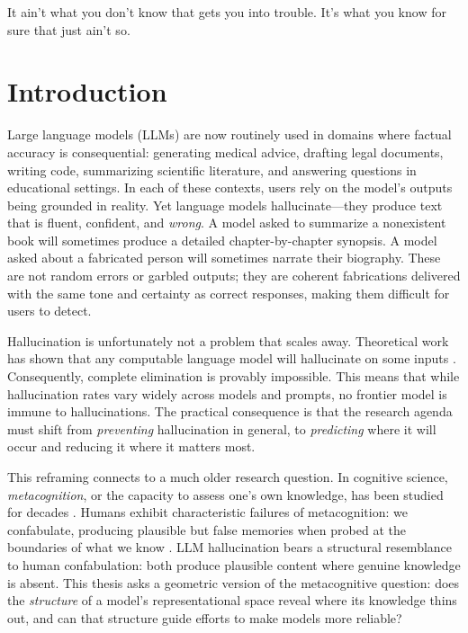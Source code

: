 \begin{savequote}[75mm]
It ain't what you don't know that gets you into trouble. It's what you know for sure that just ain't so.
\end{savequote}

\chapter{Introduction}
\label{introduction}

Large language models (LLMs) are now routinely used in domains where factual accuracy is consequential: generating medical advice, drafting legal documents, writing code, summarizing scientific literature, and answering questions in educational settings. In each of these contexts, users rely on the model's outputs being grounded in reality. Yet language models hallucinate---they produce text that is fluent, confident, and \emph{wrong}. A model asked to summarize a nonexistent book will sometimes produce a detailed chapter-by-chapter synopsis. A model asked about a fabricated person will sometimes narrate their biography. These are not random errors or garbled outputs; they are coherent fabrications delivered with the same tone and certainty as correct responses, making them difficult for users to detect. %

Hallucination is unfortunately not a problem that scales away. Theoretical work has shown that any computable language model will hallucinate on some inputs \citep{xu2024hallucination}. Consequently, complete elimination is provably impossible. This means that while hallucination rates vary widely across models and prompts,  no frontier model is immune to hallucinations. The practical consequence is that the research agenda must shift from \emph{preventing} hallucination in general, to \emph{predicting} where it will occur and reducing it where it matters most. 

This reframing connects to a much older research question. In cognitive science, \emph{metacognition}, or the capacity to assess one's own knowledge, has been studied for decades \citep{kadavath2022language}. Humans exhibit characteristic failures of metacognition: we confabulate, producing plausible but false memories when probed at the boundaries of what we know \citep{roediger1995creating}. LLM hallucination bears a structural resemblance to human confabulation: both produce plausible content where genuine knowledge is absent. This thesis asks a geometric version of the metacognitive question: does the \emph{structure} of a model's representational space reveal where its knowledge thins out, and can that structure guide efforts to make models more reliable?

